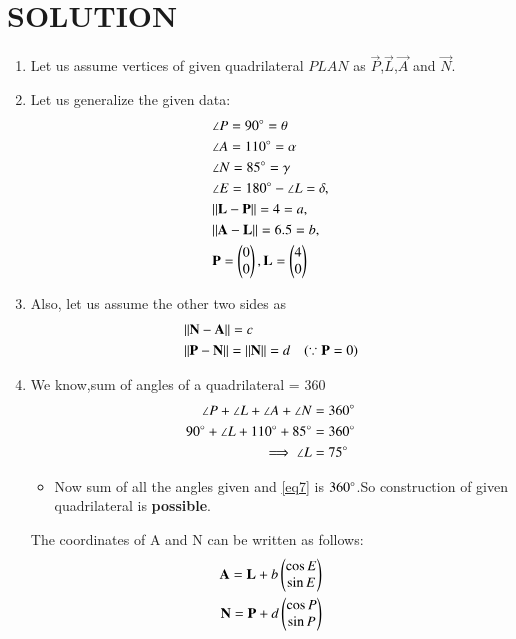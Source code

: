 \documentclass[journal,12pt,twocolumn]{IEEEtran}
\begin{document}
\section{SOLUTION}
\begin{enumerate}
\item Let us assume vertices of given quadrilateral $PLAN$ as $\vec{P}$,$\vec{L}$,$\vec{A}$ and $\vec{N}$.
\item Let us generalize the given data:
\begin{align}
&\angle P=90\degree=\theta \label{eq1}
\\
&\angle A=110\degree=\alpha
\\
&\angle N= 85\degree=\gamma \label{eq2}
\\
&\angle E=180\degree-\angle L=\delta,
\\
&\Vert\mathbf{L}-\mathbf{P}\rVert =4=a, \label{eq3}
\\
&\Vert\mathbf{A}-\mathbf{L}\rVert =6.5=b,\label{eq4}
\\
&\mathbf{P}=\begin{pmatrix}0\\0\end{pmatrix}, \mathbf{L}=\begin{pmatrix}4\\0\end{pmatrix} \label{eq5}
\end{align}
\item Also, let us assume the other two sides as
\begin{align}
 &\Vert\mathbf{N}-\mathbf{A}\rVert=c \label{eq6}
\\
&\Vert\mathbf{P}-\mathbf{N}\rVert=\Vert\mathbf{N}\rVert=d \quad(\because \mathbf{P}=0) \label{eq7}
\end{align}  
\item We know,sum of angles of a quadrilateral = 360\degree
\begin{align}
\angle P + \angle L +\angle A +\angle N &= 360\degree
\\
90 \degree + \angle L + 110 \degree + 85 \degree &= 360\degree
\\
\implies \angle L &= 75 \degree \label{eq8}
\end{align}
\begin{itemize}
\item Now sum of all the angles given and \eqref{eq7} is $360\degree$.So construction of given quadrilateral is \textbf{possible}.
\end{itemize}
\begin{lemma}
\label{lemma}
The coordinates of A and N can be written as follows:
\begin{align}
\vec{A}=\vec{L} +b \myvec{\cos E\\\sin E} \label{eq9}
\\
\vec{N}=\vec{P} +d \myvec{\cos P\\\sin P} \label{eq10}

\end{align}
\end{lemma}
\end{enumerate}
\end{document}
